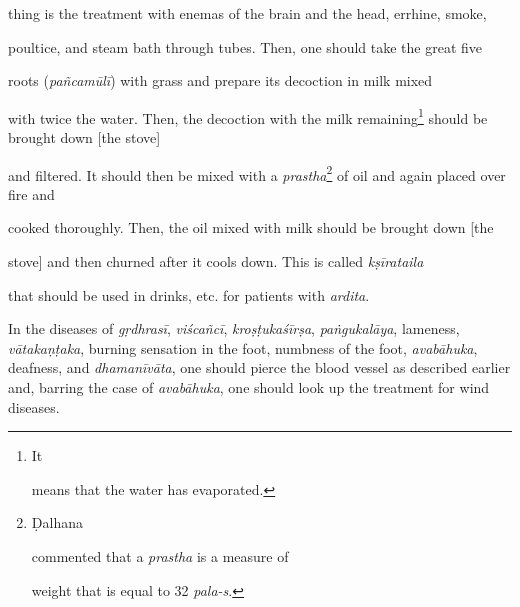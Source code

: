 \begin{translation}
\begin{tt}
        thing is the treatment with enemas of the
        brain and the head, errhine, smoke,

        poultice, and steam bath through tubes.
        Then, one should take the great five

        roots (\textit{pañcamūlī}) with grass and
        prepare its decoction in milk mixed

        with twice the water. Then, the decoction
        with the milk remaining\footnote{It

            means that the water has evaporated.}
        should be brought down [the stove]

        and filtered. It should then be mixed with
        a \textit{prastha}\footnote{Ḍalhana

            commented \citep[425]{vulgate} that a
            \textit{prastha} is a measure of

            weight that is equal to 32
            \textit{pala-s}.} of oil and again placed over fire and

        cooked thoroughly. Then, the oil mixed
        with milk should be brought down [the

                stove] and then churned after it cools
        down. This is called \textit{kṣīrataila}

        that should be used in drinks, etc. for
        patients with \textit{ardita}.



        \item[23]

        In the diseases of \textit{gṛdhrasī},
        \textit{viścañcī}, \textit{kroṣṭukaśīrṣa}, \textit{paṅgukalāya}, lameness,
        \textit{vātakaṇṭaka}, burning sensation in the foot, numbness of the foot,
        \textit{avabāhuka}, deafness, and \textit{dhamanīvāta}, one should pierce the
        blood vessel as described earlier and, barring the case of \textit{avabāhuka},
        one should look up the treatment for wind diseases.



        \item[24]


\end{tt}
\end{translation}
